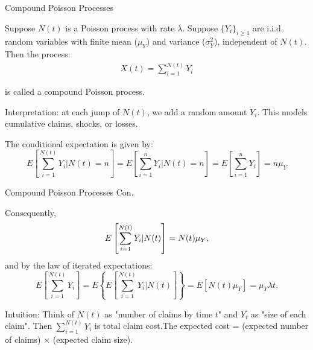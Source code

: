 \documentclass{beamer}
\begin{document}
\begin{frame}{Compound Poisson Processes}

    {\footnotesize \footnotesize
    \par  Suppose \( N(t) \) is a Poisson process with rate \(\lambda\).
    Suppose \(\{Y_i\}_{i \geq 1}\) are i.i.d. random variables with finite mean ($\mu_Y$) and variance ($\sigma^2_Y$), independent of \(N(t)\). Then the process:
    \begin{align*}
        X(t) = \sum_{i=1}^{N(t)} Y_i
    \end{align*}
    \par  is called a compound Poisson process.
    \vspace{1em}
    \par \pause Interpretation: at each jump of \(N(t)\), we add a random amount \(Y_i\). This models cumulative claims, shocks, or losses.
    \vspace{1em}
    \par The conditional expectation is given by:
        \[
        E \left[ \sum_{i=1}^{N(t)} Y_i | N(t) = n \right] = E \left[ \sum_{i=1}^n Y_i | N(t) = n \right] = E \left[ \sum_{i=1}^n Y_i \right] = n \mu_Y
        \]
    }
    
\end{frame}


\begin{frame}{Compound Poisson Processes Con.}

    {\footnotesize \footnotesize
    \par Consequently,
    \[
    E \left[ \sum_{i=1}^{N(t)} Y_i | N(t) \right] = N(t) \mu_Y,
    \vspace{1em}
    \]
    and by the law of iterated expectations:
    \vspace{1em}
    \[
    E \left[ \sum_{i=1}^{N(t)} Y_i \right] = E \left\{ E \left[ \sum_{i=1}^{N(t)} Y_i | N(t) \right] \right\} = E [N(t) \mu_Y] = \mu_Y \lambda t.
    \]
    \vspace{1em}
    \par\pause Intuition: Think of \(N(t)\) as "number of claims by time \(t\)" and \(Y_i\) as "size of each claim".  
     Then \(\sum_{i=1}^{N(t)} Y_i\) is total claim cost.The expected cost = (expected number of claims) × (expected claim size).
    }
    
\end{frame}
\end{document}
